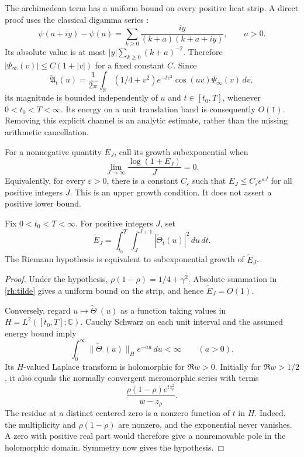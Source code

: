 The archimedean term has a uniform bound on every positive heat strip. A direct proof uses the classical digamma series \cite{DLMFDigamma}:
\[
\psi(a+iy)-\psi(a)=
\sum_{k\ge0}\frac{iy}{(k+a)(k+a+iy)},
\qquad a>0.
\]
Its absolute value is at most \(|y|\sum_{k\ge0}(k+a)^{-2}\). Therefore \(|\Psi_\infty(v)|\le C(1+|v|)\) for a fixed constant \(C\). Since
\[
\widetilde{\mathfrak A}_t(u)=\frac1{2\pi}
\int_{\mathbb R}(1/4+v^2)e^{-tv^2}\cos(uv)
\Psi_\infty(v)\,dv,
\]
its magnitude is bounded independently of \(u\) and \(t\in[t_0,T]\), whenever \(0<t_0<T<\infty\). Its energy on a unit translation band is consequently \(O(1)\). Removing this explicit channel is an analytic estimate, rather than the missing arithmetic cancellation.

For a nonnegative quantity \(E_J\), call its growth subexponential when
\begin{equation}\label{rh:subexp}
\lim_{J\to\infty}\frac{\log(1+E_J)}J=0.
\end{equation}
Equivalently, for every \(\varepsilon>0\), there is a constant
\(C_\varepsilon\) such that \(E_J\le C_\varepsilon e^{\varepsilon J}\)
for all positive integers \(J\). This is an upper growth condition. It does
not assert a positive lower bound.

\begin{theorem}\label{rh:energy}
Fix \(0<t_0<T<\infty\). For positive integers \(J\), set
\begin{equation}\label{rh:energydef}
\widetilde E_J=\int_{t_0}^T\int_J^{J+1}
|\widetilde\Theta_t(u)|^2\,du\,dt.
\end{equation}
The Riemann hypothesis is equivalent to subexponential growth of \(\widetilde E_J\).
\end{theorem}

\begin{proof}
Under the hypothesis, \(\rho(1-\rho)=1/4+\gamma^2\). Absolute summation in \eqref{rh:tilde} gives a uniform bound on the strip, and hence \(\widetilde E_J=O(1)\).

Conversely, regard \(u\mapsto\widetilde\Theta_\cdot(u)\) as a function taking values in \(H=L^2([t_0,T];\mathbb C)\). Cauchy Schwarz on each unit interval and the assumed energy bound imply
\[
\int_0^\infty\|\widetilde\Theta_\cdot(u)\|_H e^{-au}\,du<\infty
\qquad(a>0).
\]
Its \(H\)-valued Laplace transform is holomorphic for \(\Re w>0\). Initially for \(\Re w>1/2\), it also equals the normally convergent meromorphic series with terms
\[
\frac{\rho(1-\rho)e^{t z_\rho^2}}{w-z_\rho}.
\]
The residue at a distinct centered zero is a nonzero function of \(t\) in \(H\). Indeed, the multiplicity and \(\rho(1-\rho)\) are nonzero, and the exponential never vanishes. A zero with positive real part would therefore give a nonremovable pole in the holomorphic domain. Symmetry now gives the hypothesis.
\end{proof}


